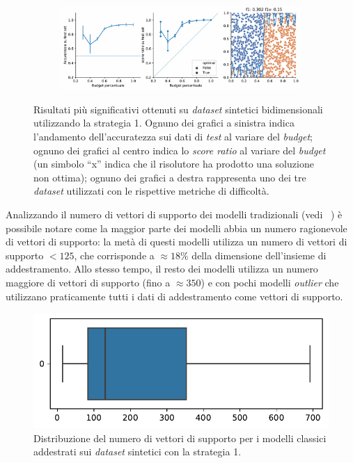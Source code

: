 \begin{figure}[ht]
    \hfill
    \begin{subfigure}{\textwidth}
        \centering
        \includegraphics[width=.8\textwidth]{img/2d/15.pdf}
    \end{subfigure}%
    \caption[]{Risultati più significativi ottenuti su \emph{dataset} sintetici bidimensionali utilizzando la strategia 1. Ognuno dei grafici a sinistra indica l'andamento dell'accuratezza sui dati di \emph{test} al variare del \emph{budget}; ognuno dei grafici al centro indica lo \emph{score ratio} al variare del \emph{budget} (un simbolo ``x'' indica che il risolutore ha prodotto una soluzione non ottima); ognuno dei grafici a destra rappresenta uno dei tre \emph{dataset} utilizzati con le rispettive metriche di difficoltà.}
\label{fig:risultati_2d}
\end{figure}


Analizzando il numero di vettori di supporto dei modelli tradizionali (vedi ~) è possibile notare come la maggior parte dei modelli abbia un numero ragionevole di vettori di supporto:
la metà di questi modelli utilizza un numero di vettori di supporto $<125$, che corrisponde a $\approx18\%$ della dimensione dell'insieme di addestramento. 
Allo stesso tempo, il resto dei modelli utilizza un numero maggiore di vettori di supporto (fino a $\approx350$) e con pochi modelli \emph{outlier} che utilizzano praticamente tutti i dati di addestramento come vettori di supporto.
\begin{figure}
    \centering
    \includegraphics[width=0.5\linewidth]{img/2d/numsv.pdf}
    \caption{Distribuzione del numero di vettori di supporto per i modelli classici addestrati sui \emph{dataset} sintetici con la strategia 1.}
    \label{fig:2d_dist_numsv}
\end{figure}


